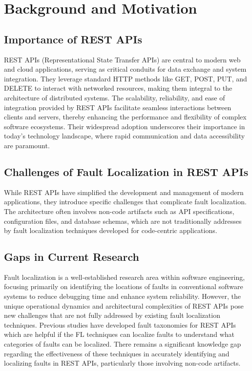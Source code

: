 \documentclass[conference]{IEEEtran}
\begin{document}
\section{Background and Motivation}
\label{sec:background-and-motivation}

\subsection{Importance of REST APIs}

REST APIs (Representational State Transfer APIs) are central to modern web and cloud applications, serving as critical conduits for data exchange and system integration. 
They leverage standard HTTP methods like GET, POST, PUT, and DELETE to interact with networked resources, making them integral to the architecture of distributed systems. 
The scalability, reliability, and ease of integration provided by REST APIs facilitate seamless interactions between clients and servers, thereby enhancing the performance and flexibility of complex software ecosystems. 
Their widespread adoption underscores their importance in today's technology landscape, where rapid communication and data accessibility are paramount.

\subsection{Challenges of Fault Localization in REST APIs}
While REST APIs have simplified the development and management of modern applications, they introduce specific challenges that complicate fault localization.
The architecture often involves non-code artifacts such as API specifications, configuration files, and database schemas, which are not traditionally addresses by fault localization techniques developed for code-centric applications. 


\subsection{Gaps in Current Research}
Fault localization is a well-established research area within software engineering, focusing primarily on identifying the locations of faults in conventional software systems to reduce debugging time and enhance system reliability.
 However, the unique operational dynamics and architectural complexities of REST APIs pose new challenges that are not fully addressed by existing fault localization techniques.
Previous studies have developed fault taxonomies for REST APIs which are helpful if the FL techniques can localize faults to understand what categories of faults can be localized.
There remains a significant knowledge gap regarding the effectiveness of these techniques in accurately identifying and localizing faults in REST APIs, particularly those involving non-code artifacts.
\end{document}
